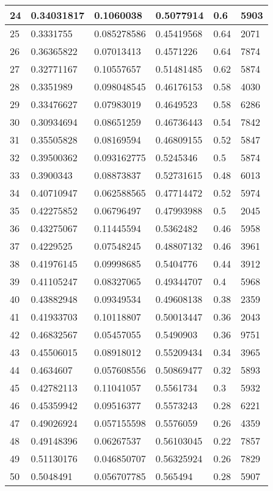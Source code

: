 \begin{longtable}{|l|l|l|l|l|l|}
24 & 0.34031817 & 0.1060038 & 0.5077914 & 0.6 & 5903 \\ \hline 
25 & 0.3331755 & 0.085278586 & 0.45419568 & 0.64 & 2071 \\ \hline 
26 & 0.36365822 & 0.07013413 & 0.4571226 & 0.64 & 7874 \\ \hline 
27 & 0.32771167 & 0.10557657 & 0.51481485 & 0.62 & 5874 \\ \hline 
28 & 0.3351989 & 0.098048545 & 0.46176153 & 0.58 & 4030 \\ \hline 
29 & 0.33476627 & 0.07983019 & 0.4649523 & 0.58 & 6286 \\ \hline 
30 & 0.30934694 & 0.08651259 & 0.46736443 & 0.54 & 7842 \\ \hline 
31 & 0.35505828 & 0.08169594 & 0.46809155 & 0.52 & 5847 \\ \hline 
32 & 0.39500362 & 0.093162775 & 0.5245346 & 0.5 & 5874 \\ \hline 
33 & 0.3900343 & 0.08873837 & 0.52731615 & 0.48 & 6013 \\ \hline 
34 & 0.40710947 & 0.062588565 & 0.47714472 & 0.52 & 5974 \\ \hline 
35 & 0.42275852 & 0.06796497 & 0.47993988 & 0.5 & 2045 \\ \hline 
36 & 0.43275067 & 0.11445594 & 0.5362482 & 0.46 & 5958 \\ \hline 
37 & 0.4229525 & 0.07548245 & 0.48807132 & 0.46 & 3961 \\ \hline 
38 & 0.41976145 & 0.09998685 & 0.5404776 & 0.44 & 3912 \\ \hline 
39 & 0.41105247 & 0.08327065 & 0.49344707 & 0.4 & 5968 \\ \hline 
40 & 0.43882948 & 0.09349534 & 0.49608138 & 0.38 & 2359 \\ \hline 
41 & 0.41933703 & 0.10118807 & 0.50013447 & 0.36 & 2043 \\ \hline 
42 & 0.46832567 & 0.05457055 & 0.5490903 & 0.36 & 9751 \\ \hline 
43 & 0.45506015 & 0.08918012 & 0.55209434 & 0.34 & 3965 \\ \hline 
44 & 0.4634607 & 0.057608556 & 0.50869477 & 0.32 & 5893 \\ \hline 
45 & 0.42782113 & 0.11041057 & 0.5561734 & 0.3 & 5932 \\ \hline 
46 & 0.45359942 & 0.09516377 & 0.5573243 & 0.28 & 6221 \\ \hline 
47 & 0.49026924 & 0.057155598 & 0.5576059 & 0.26 & 4359 \\ \hline 
48 & 0.49148396 & 0.06267537 & 0.56103045 & 0.22 & 7857 \\ \hline 
49 & 0.51130176 & 0.046850707 & 0.56325924 & 0.26 & 7829 \\ \hline 
50 & 0.5048491 & 0.056707785 & 0.565494 & 0.28 & 5907 \\ \hline 
\end{longtable}